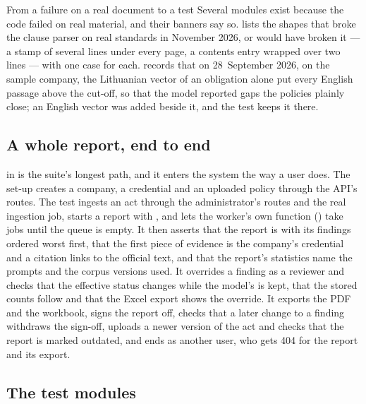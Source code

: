 \begin{lessonbox}{From a failure on a real document to a test}
Several modules exist because the code failed on real material, and their banners say so.
 lists the shapes that broke the clause parser on real
standards in November 2026, or would have broken it --- a stamp of several lines under every page, a contents entry
wrapped over two lines --- with one case for each.  records that
on 28~September 2026, on the sample company, the Lithuanian vector of an obligation alone put
every English passage above the cut-off, so that the model reported gaps the policies plainly
close; an English vector was added beside it, and the test keeps it there.
\end{lessonbox}

\subsection{A whole report, end to end}\label{sec:testing:api:report}

 in  is the suite's
longest path, and it enters the system the way a user does. The set-up creates a company, a
credential and an uploaded policy through the API's routes. The test ingests an act through
the administrator's routes and the real ingestion job, starts a report with
, and lets the worker's own function () take jobs
until the queue is empty. It then asserts that the report is  with its findings
ordered worst first, that the first piece of evidence is the company's credential and a
citation links to the official text, and that the report's statistics name the prompts and the
corpus versions used. It overrides a finding as a reviewer and checks that the effective
status changes while the model's is kept, that the stored counts follow and that the Excel
export shows the override. It exports the PDF and the workbook, signs the report off, checks
that a later change to a finding withdraws the sign-off, uploads a newer version of the act
and checks that the report is marked outdated, and ends as another user, who gets 404 for the
report and its export.

\subsection{The test modules}\label{sec:testing:api:modules}

